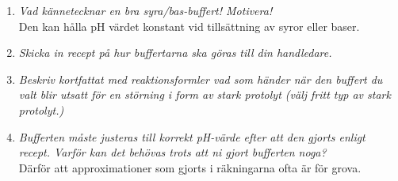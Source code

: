 \documentclass[./chem_exercises.tex]{subfiles}
\begin{document}
\begin{multicols}{2}
\begin{enumerate}[label=(\alph*)]
\item \textit{Vad kännetecknar en bra syra/bas-buffert! Motivera!}\\
Den kan hålla pH värdet konstant vid tillsättning av syror eller baser.

\item \textit{Skicka in recept på hur buffertarna ska göras till din handledare.}\\

\item \textit{Beskriv kortfattat med reaktionsformler vad som händer när den buffert du valt
blir utsatt för en störning i form av stark protolyt (välj fritt typ av stark protolyt.)}

\item \textit{Bufferten måste justeras till korrekt pH-värde efter att den gjorts enligt recept.
Varför kan det behövas trots att ni gjort bufferten noga?}\\
Därför att approximationer som gjorts i räkningarna ofta är för grova.

\end{enumerate}
\end{multicols}
\end{document}
